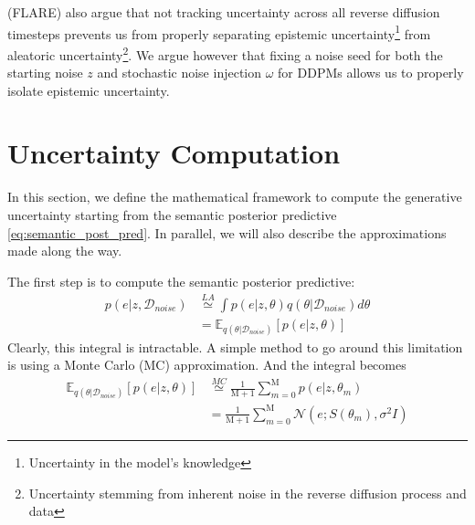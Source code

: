 \cite{gupta_quantifying_2026} (FLARE) also argue that not tracking uncertainty across all reverse diffusion timesteps prevents us from properly separating epistemic uncertainty\footnote{Uncertainty in the model's knowledge} from aleatoric uncertainty\footnote{Uncertainty stemming from inherent noise in the reverse diffusion process and data}. We argue however that fixing a noise seed for both the starting noise $z$ and stochastic noise injection $\omega$ for \acs{DDPM}s allows us to properly isolate epistemic uncertainty.




\section{Uncertainty Computation}
\label{sec:bg_gu_uncertainty_computation_mc}

In this section, we define the mathematical framework to compute the generative uncertainty starting from the semantic posterior predictive \autoref{eq:semantic_post_pred}. In parallel, we will also describe the approximations made along the way.

The first step is to compute the semantic posterior predictive:
\begin{align}
p(e | z, \mathcal{D}_{noise}) &\overset{LA}{\simeq} \int p(e|z,\theta) q(\theta|\mathcal{D}_{noise}) d\theta \\
&= \mathbb{E}_{q(\theta|\mathcal{D}_{noise})}\left[p(e|z,\theta)\right]
\end{align}
Clearly, this integral is intractable. A simple method to go around this limitation is using a Monte Carlo (\acs{MC}) approximation. And the integral becomes
\begin{align}
\mathbb{E}_{q(\theta|\mathcal{D}_{noise})}\left[p(e|z,\theta)\right] &\overset{MC}{\simeq} \frac{1}{\mathrm{M}+1} \sum^\mathrm{M}_{m=0}p(e|z,\theta_m)\\ 
&=\frac{1}{\mathrm{M}+1} \sum^\mathrm{M}_{m=0} \mathcal{N}(e;S(\theta_m), \sigma^2 I)
\end{align}

